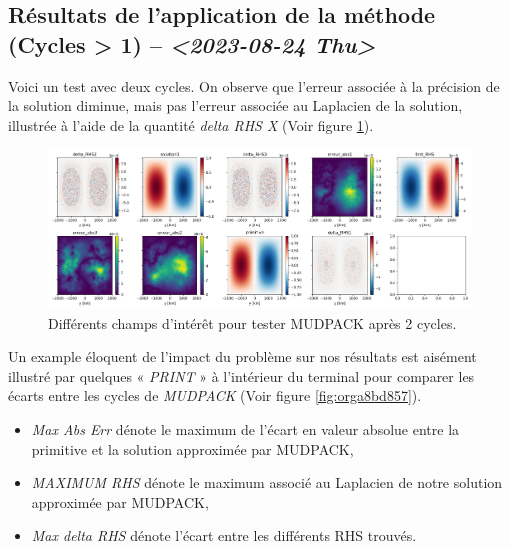 \documentclass[10pt]{report}
\numberwithin{equation}{section}
\begin{document}
\subsection{Résultats de l'application de la méthode (Cycles > 1) -- \textit{<2023-08-24 Thu>}}
\label{sec:org4d70371}
Voici un test avec deux cycles.
On observe que l'erreur associée à la précision de la solution diminue, mais pas l'erreur associée au Laplacien de la solution, illustrée à l'aide de la quantité \emph{delta RHS X} (Voir figure \ref{fig:orgf3cbac5}).

\begin{figure}[htbp]
\centering
\includegraphics[width=.9\linewidth]{figures/MUDPACK/2023-08-23_MUDPACK_test_dirichlet3.png}
\caption{\label{fig:orgf3cbac5}Différents champs d'intérêt pour tester MUDPACK après 2 cycles.}
\end{figure}

Un example éloquent de l'impact du problème sur nos résultats est aisément illustré par quelques « \emph{PRINT} » à l'intérieur du terminal pour comparer les écarts entre les cycles de \emph{MUDPACK} (Voir figure \ref{fig:orga8bd857}).
\begin{itemize}
\item \emph{Max Abs Err} dénote le maximum de l'écart en valeur absolue entre la primitive et la solution approximée par MUDPACK,
\item \emph{MAXIMUM RHS} dénote le maximum associé au Laplacien de notre solution approximée par MUDPACK,
\item \emph{Max delta RHS} dénote l'écart entre les différents RHS trouvés.
\end{itemize}
\end{document}

